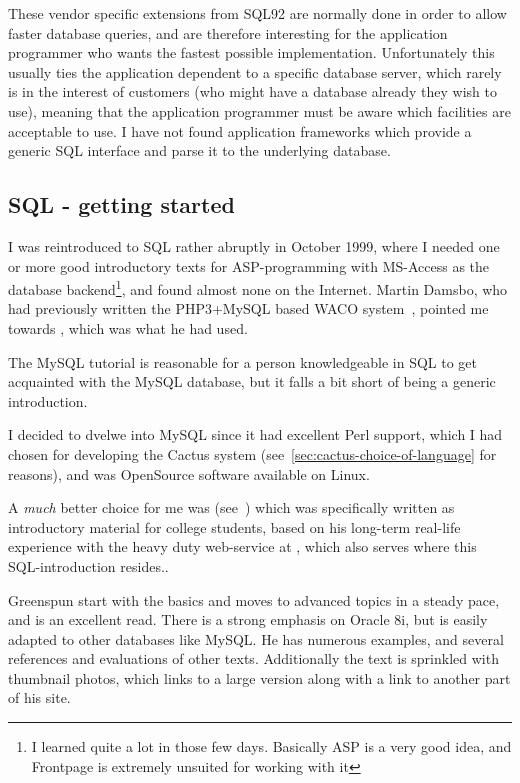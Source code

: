 These vendor specific extensions from SQL92 are normally done in order
to allow faster database queries, and are therefore interesting for
the application programmer who wants the fastest possible
implementation.  Unfortunately this usually ties the application
dependent to a specific database server, which rarely is in the
interest of customers (who might have a database already they wish to
use), meaning that the application programmer must be aware which
facilities are acceptable to use.  I have not found application
frameworks which provide a generic SQL interface and parse it to the
underlying database.



\subsection{SQL - getting started}
\label{sec:sql-getting-started}

I was reintroduced to SQL rather abruptly in October 1999, where I
needed one or more good introductory texts for ASP-programming with
MS-Access as the database backend\footnote{I learned quite a lot in
  those few days.  Basically ASP is a very good idea, and Frontpage is
  extremely unsuited for working with it}, and found almost none on
the Internet.  Martin Damsbo, who had previously written the
PHP3+MySQL based WACO system~\cite{mez-waco}, pointed me towards
, which was what he had used.

The MySQL tutorial is reasonable for a person knowledgeable in SQL to
get acquainted with the MySQL database, but it falls a bit short of
being a generic introduction.

I decided to dvelwe into MySQL since it had excellent Perl support,
which I had chosen for developing the Cactus system
(see~\vref{sec:cactus-choice-of-language} for reasons), and was
OpenSource software available on Linux.


A \textit{much} better choice for me was
(see~\cite{greenspun-sql}) which was specifically written as
introductory material for college students, based on his long-term
real-life experience with the heavy duty web-service at
, which also serves
 where this SQL-introduction
resides..

Greenspun start with the basics and moves to advanced
topics in a steady pace, and is an excellent read.  There is a strong
emphasis on Oracle 8i, but is easily adapted to other databases like
MySQL.  He has numerous examples, and several references and
evaluations of other texts.  Additionally the text is sprinkled with
thumbnail photos, which links to a large version along with a link to
another part of his site.

